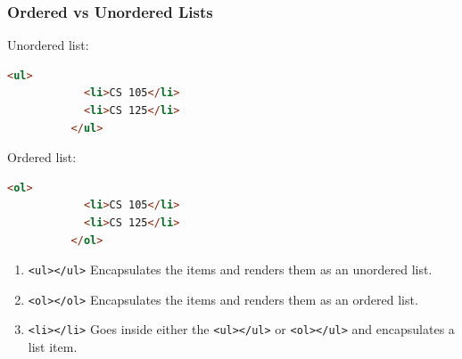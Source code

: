 \documentclass{beamer}
\begin{document}
%
%
\begin{frame}[fragile]
    \frametitle{Ordered vs Unordered Lists}

    \begin{minipage}{0.49\textwidth}
        Unordered list:
        \begin{lstlisting}[language=html,autogobble]
          <ul>
            <li>CS 105</li>
            <li>CS 125</li>
          </ul>
        \end{lstlisting} 
    \end{minipage}
    \begin{minipage}{0.49\textwidth}
        Ordered list:
        \begin{lstlisting}[language=html,autogobble]
          <ol>
            <li>CS 105</li>
            <li>CS 125</li>
          </ol>
        \end{lstlisting} 
    \end{minipage}
    \vfill
    \begin{enumerate}
        \item \lstinline|<ul></ul>| \textrightarrow Encapsulates the items and renders them as an unordered list.
        \item \lstinline|<ol></ol>| \textrightarrow Encapsulates the items and renders them as an ordered list.
        \item \lstinline|<li></li>| \textrightarrow Goes inside either the \lstinline|<ul></ul>| or \lstinline|<ol></ul>| and encapsulates a list item.
    \end{enumerate}
\end{frame}
\end{document}
